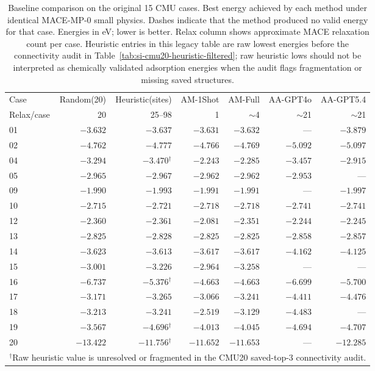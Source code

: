 \documentclass[%
 preprint,
 superscriptaddress,
 amsmath,amssymb,
 aps,
 prb,
 floatfix,
]{revtex4-2}
\begin{document}
\begin{table}[ht]
\centering
\scriptsize
\caption{Baseline comparison on the original 15 CMU cases. Best energy achieved by each method under identical MACE-MP-0 small physics. Dashes indicate that the method produced no valid energy for that case. Energies in eV; lower is better. Relax column shows approximate MACE relaxation count per case. Heuristic entries in this legacy table are raw lowest energies before the connectivity audit in Table~\ref{tab:si-cmu20-heuristic-filtered}; raw heuristic lows should not be interpreted as chemically validated adsorption energies when the audit flags fragmentation or missing saved structures.}
\label{tab:si-baseline-comparison}
\begin{tabular}{lrrrrrr}
\toprule
Case & Random(20) & Heuristic(sites) & AM-1Shot & AM-Full & AA-GPT4o & AA-GPT5.4 \\
Relax/case & 20 & 25--98 & 1 & $\sim$4 & $\sim$21 & $\sim$21 \\
\midrule
  01 & $-3.632$ & $-3.637$ & $-3.631$ & $-3.632$ & --- & $-3.879$ \\
  02 & $-4.762$ & $-4.777$ & $-4.766$ & $-4.769$ & $-5.092$ & $-5.097$ \\
  04 & $-3.294$ & $-3.470$\ensuremath{^\dagger} & $-2.243$ & $-2.285$ & $-3.457$ & $-2.915$ \\
  05 & $-2.965$ & $-2.967$ & $-2.962$ & $-2.962$ & $-2.953$ & --- \\
  09 & $-1.990$ & $-1.993$ & $-1.991$ & $-1.991$ & --- & $-1.997$ \\
  10 & $-2.715$ & $-2.721$ & $-2.718$ & $-2.718$ & $-2.741$ & $-2.741$ \\
  12 & $-2.360$ & $-2.361$ & $-2.081$ & $-2.351$ & $-2.244$ & $-2.245$ \\
  13 & $-2.825$ & $-2.828$ & $-2.825$ & $-2.825$ & $-2.858$ & $-2.857$ \\
  14 & $-3.623$ & $-3.613$ & $-3.617$ & $-3.617$ & $-4.162$ & $-4.125$ \\
  15 & $-3.001$ & $-3.226$ & $-2.964$ & $-3.258$ & --- & --- \\
  16 & $-6.737$ & $-5.376$\ensuremath{^\dagger} & $-4.663$ & $-4.663$ & $-6.699$ & $-5.700$ \\
  17 & $-3.171$ & $-3.265$ & $-3.066$ & $-3.241$ & $-4.411$ & $-4.476$ \\
  18 & $-3.213$ & $-3.241$ & $-2.519$ & $-3.129$ & $-4.483$ & --- \\
  19 & $-3.567$ & $-4.696$\ensuremath{^\dagger} & $-4.013$ & $-4.045$ & $-4.694$ & $-4.707$ \\
  20 & $-13.422$ & $-11.756$\ensuremath{^\dagger} & $-11.652$ & $-11.653$ & --- & $-12.285$ \\
\midrule
\multicolumn{7}{l}{\ensuremath{^\dagger}Raw heuristic value is unresolved or fragmented in the CMU20 saved-top-3 connectivity audit.} \\
\bottomrule
\end{tabular}
\end{table}
\end{document}

